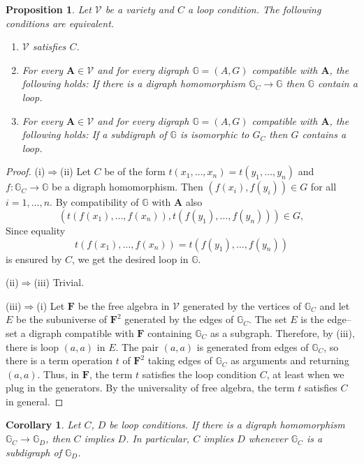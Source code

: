 \documentclass[a4paper]{article}
\newcommand{\var}[1]{\mathcal{#1}}
\newcommand{\alg}[1]{\mathbf{#1}}
\newcommand{\lc}[1]{#1}
\newcommand{\relstr}[1]{\mathbb{#1}}
\newtheorem{proposition}{Proposition}
\newtheorem{corollary}{Corollary}
\begin{document}
\begin{proposition}
\label{loop-eq}
Let $\var V$ be a variety and $\lc C$ a loop condition.
The following conditions are equivalent.
\begin{enumerate}
\item[(i)] $\var V$ satisfies $\lc C$.
\item[(ii)] For every $\alg A\in\var V$ and for every digraph
  $\relstr G = (A, G)$ compatible
  with $\alg A$, the following holds: If there is a digraph homomorphism
  $\relstr G_{\lc C}\to \relstr G$ then $\relstr G$ contain a loop.
\item[(iii)] For every $\alg A\in\var V$ and for every digraph
  $\relstr G = (A, G)$ compatible
  with $\alg A$, the following holds: If a subdigraph of $\relstr G$ is
  isomorphic to $G_{\lc C}$ then $G$ contains a loop.
\end{enumerate}
\end{proposition}
\begin{proof}
  (i)$\Rightarrow$(ii)
  Let $\lc C$ be of the form
  $t(x_1, \ldots, x_n) = t(y_1, \dots, y_n)$ and
  $f\colon \relstr G_{\lc C}\to\relstr G$ be a digraph
  homomorphism. Then $(f(x_i), f(y_i))\in G$ for all
  $i=1,\ldots, n$. By compatibility of $\relstr G$ with $\alg A$ also
  $$(t(f(x_1), \ldots, f(x_n)), t(f(y_1), \dots, f(y_n)))\in G,$$
  Since equality
  $$t(f(x_1), \ldots, f(x_n)) = t(f(y_1), \dots, f(y_n))$$
  is ensured by $\lc C$, we get the desired loop in $\relstr G$. 

(ii)$\Rightarrow$(iii) Trivial.

(iii)$\Rightarrow$(i) Let $\alg F$ be the free algebra in $\var V$
generated by the vertices of $\relstr G_{\lc C}$ and let $E$ be the subuniverse of
$\alg F^2$ generated by the edges of $\relstr G_{\lc C}$.
The set $E$ is the edge--set a
digraph compatible with $\alg F$ containing $\relstr G_{\lc C}$ as a subgraph. Therefore, by
(iii), there is loop $(a,a)$ in $E$. The pair $(a,a)$ is generated from edges of $\relstr G_C$, so there is a term operation $t$ of $\alg F^2$ taking edges of
$\relstr G_{\lc C}$ as arguments and returning $(a,a)$. Thus, in $\alg F$, the
term $t$ satisfies the loop condition $C$, at least when we plug in the generators. By the universality of free algebra, the term $t$
satisfies $\lc C$ in general.
\end{proof}

\begin{corollary}
\label{graph-homo}
Let $\lc C$, $\lc D$ be loop conditions. If there is a digraph
homomorphism $\relstr G_{\lc C}\to \relstr G_{\lc D}$, then $\lc C$ implies
$\lc D$. In particular, $\lc C$ implies $\lc D$ whenever $\relstr G_{\lc C}$ is a subdigraph of
$\relstr G_{\lc D}$.
\end{corollary}
\end{document}
